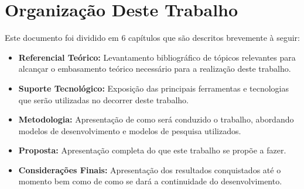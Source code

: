 \section{Organização Deste Trabalho}

Este documento foi dividido em 6 capítulos que são descritos brevemente à seguir:

\begin{itemize}
	\item \textbf{Referencial Teórico:} Levantamento bibliográfico de tópicos relevantes para alcançar o embasamento teórico necessário para a realização deste trabalho.
	\item \textbf{Suporte Tecnológico:} Exposição das principais ferramentas e tecnologias que serão utilizadas no decorrer deste trabalho.
	\item \textbf{Metodologia:} Apresentação de como será conduzido o trabalho, abordando modelos de desenvolvimento e modelos de pesquisa utilizados.
	\item \textbf{Proposta:} Apresentação completa do que este trabalho se propõe a fazer.
	\item \textbf{Considerações Finais:} Apresentação dos resultados conquistados até o momento bem como de como se dará a continuidade do desenvolvimento.
\end{itemize}

